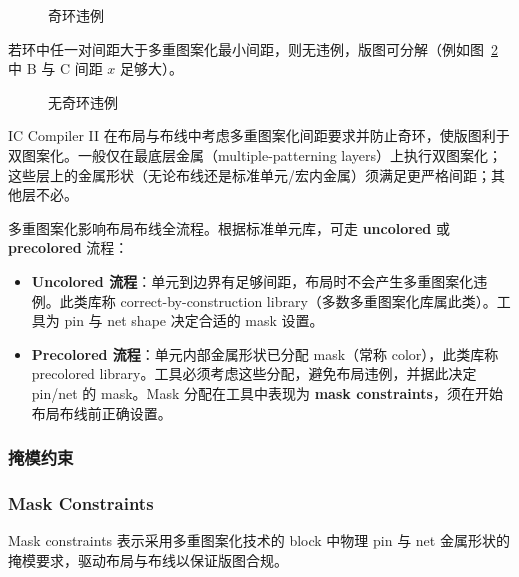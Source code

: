 \begin{figure}[htbp]
\centering
{}
\caption{奇环违例}
\label{fig:odd-cycle}
\end{figure}

若环中任一对间距大于多重图案化最小间距，则无违例，版图可分解（例如图~\ref{fig:no-odd-cycle} 中 B 与 C 间距 $x$ 足够大）。

\begin{figure}[htbp]
\centering
{}
\caption{无奇环违例}
\label{fig:no-odd-cycle}
\end{figure}

IC Compiler II 在布局与布线中考虑多重图案化间距要求并防止奇环，使版图利于双图案化。一般仅在最底层金属（multiple-patterning layers）上执行双图案化；这些层上的金属形状（无论布线还是标准单元/宏内金属）须满足更严格间距；其他层不必。

多重图案化影响布局布线全流程。根据标准单元库，可走 \textbf{uncolored} 或 \textbf{precolored} 流程：
\begin{itemize}
  \item \textbf{Uncolored 流程}：单元到边界有足够间距，布局时不会产生多重图案化违例。此类库称 correct-by-construction library（多数多重图案化库属此类）。工具为 pin 与 net shape 决定合适的 mask 设置。
  \item \textbf{Precolored 流程}：单元内部金属形状已分配 mask（常称 color），此类库称 precolored library。工具必须考虑这些分配，避免布局违例，并据此决定 pin/net 的 mask。Mask 分配在工具中表现为 \textbf{mask constraints}，须在开始布局布线前正确设置。
\end{itemize}

\subsubsection{掩模约束}
\subsubsection*{Mask Constraints}

Mask constraints 表示采用多重图案化技术的 block 中物理 pin 与 net 金属形状的掩模要求，驱动布局与布线以保证版图合规。

